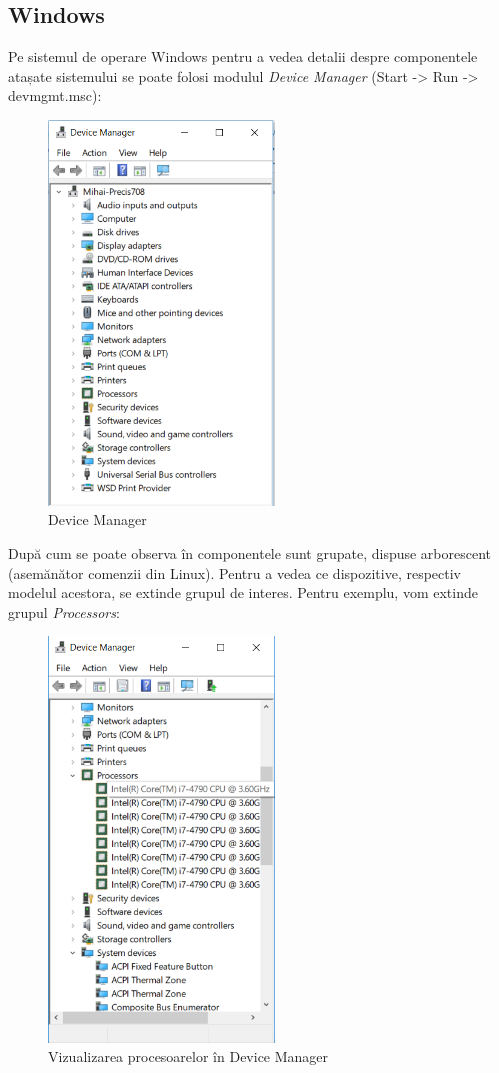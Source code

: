 \subsection{Windows}
\label{sec:hardware-virtualizare-windows}

Pe sistemul de operare Windows pentru a vedea detalii despre componentele
atașate sistemului se poate folosi modulul \textit{Device Manager} (Start -> Run
-> devmgmt.msc):

\begin{figure}[!htbp]
	\centering
	\includegraphics[width=6cm]{chapters/08-hw/img/devmanager-img.png}
	\caption{Device Manager}
	\label{fig:hw-devmanager}
\end{figure}

După cum se poate observa în 
componentele sunt grupate, dispuse arborescent (asemănător comenzii 
din Linux). Pentru a vedea ce dispozitive, respectiv modelul acestora, se
extinde grupul de interes. Pentru exemplu, vom extinde grupul
\textit{Processors}:

\begin{figure}[!htbp]
	\centering
	\includegraphics[width=6cm]{chapters/08-hw/img/devmanager-virt-img.png}
	\caption{Vizualizarea procesoarelor în Device Manager}
	\label{fig:hw-devmanager-virt}
\end{figure}


